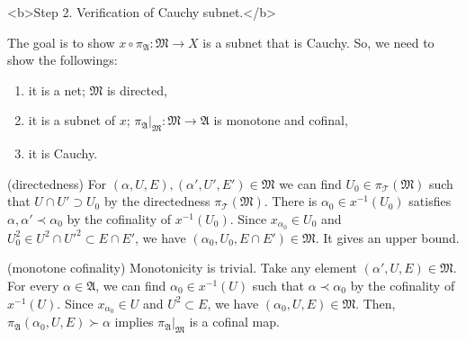 \documentclass[11pt]{amsart}
\begin{document}
\begin{pf}
<b>Step 2. Verification of Cauchy subnet.</b>

The goal is to show $x\circ\pi_\mathfrak{A}:\mathfrak{M}\to X$ is a subnet that is Cauchy.
So, we need to show the followings:
\begin{enumerate}
\item it is a net; $\mathfrak{M}$ is directed,
\item it is a subnet of $x$; $\pi_\mathfrak{A}|_\mathfrak{M}:\mathfrak{M}\to\mathfrak{A}$ is monotone and cofinal,
\item it is Cauchy.
\end{enumerate}

(directedness)
For $(\alpha,U,E),(\alpha',U',E')\in\mathfrak{M}$ we can find $U_0\in\pi_\mathcal{T}(\mathfrak{M})$ such that $U\cap U'\supset U_0$ by the directedness $\pi_\mathcal{T}(\mathfrak{M})$.
There is $\alpha_0\in x^{-1}(U_0)$ satisfies $\alpha,\alpha'\prec\alpha_0$ by the cofinality of $x^{-1}(U_0)$.
Since $x_{\alpha_0}\in U_0$ and $U_0^2\in U^2\cap U'^2\subset E\cap E'$, we have $(\alpha_0,U_0,E\cap E')\in\mathfrak{M}$.
It gives an upper bound.

(monotone cofinality)
Monotonicity is trivial.
Take any element $(\alpha',U,E)\in\mathfrak{M}$.
For every $\alpha\in\mathfrak{A}$, we can find $\alpha_0\in x^{-1}(U)$ such that $\alpha\prec\alpha_0$ by the cofinality of $x^{-1}(U)$.
Since $x_{\alpha_0}\in U$ and $U^2\subset E$, we have $(\alpha_0,U,E)\in\mathfrak{M}$.
Then, $\pi_\mathfrak{A}(\alpha_0,U,E)\succ\alpha$ implies $\pi_\mathfrak{A}|_\mathfrak{M}$ is a cofinal map.


\end{pf}
\end{document}
